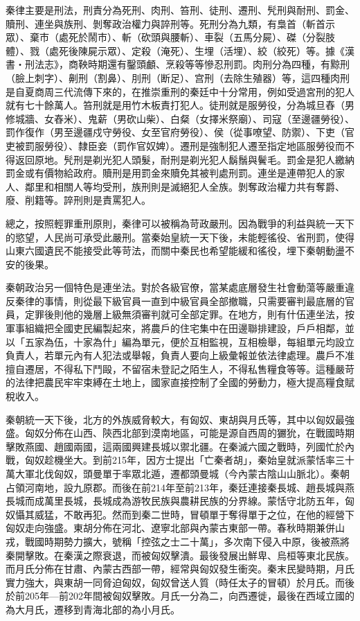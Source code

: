 秦律主要是刑法，刑責分為死刑、肉刑、笞刑、徒刑、遷刑、髠刑與耐刑、罰金、贖刑、連坐與族刑、剝奪政治權力與誶刑等。死刑分為九類，有梟首（斬首示眾）、棄市（處死於鬧市）、斬（砍頭與腰斬）、車裂（五馬分屍）、磔（分裂肢體）、戮（處死後陳屍示眾）、定殺（淹死）、生埋（活埋）、絞（絞死）等。據《漢書‧刑法志》，商鞅時期還有鑿頭顱、烹殺等等慘忍刑罰。肉刑分為四種，有黥刑（臉上刺字）、劓刑（割鼻）、刖刑（断足）、宫刑（去除生殖器）等，這四種肉刑是自夏商周三代流傳下來的，在推崇重刑的秦廷中十分常用，例如受過宮刑的犯人就有七十餘萬人。笞刑就是用竹木板責打犯人。徒刑就是服勞役，分為城旦舂（男修城牆、女舂米）、鬼薪（男砍山柴）、白粲（女擇米祭廟）、司寇（至邊疆勞役）、罰作復作（男至邊疆戍守勞役、女至官府勞役）、侯（從事嘹望、防禦）、下吏（官吏被罰服勞役）、隸臣妾（罰作官奴婢）。遷刑是強制犯人遷至指定地區服勞役而不得返回原地。髠刑是剃光犯人頭髮，耐刑是剃光犯人鬍鬚與鬢毛。罰金是犯人繳納罰金或有價物給政府。贖刑是用罰金來贖免其被判處刑罰。連坐是連帶犯人的家人、鄰里和相關人等均受刑，族刑則是滅絕犯人全族。剝奪政治權力共有奪爵、廢、削籍等。誶刑則是責罵犯人。

總之，按照輕罪重刑原則，秦律可以被稱為苛政嚴刑。因為戰爭的利益與統一天下的慾望，人民尚可承受此嚴刑。當秦始皇統一天下後，未能輕徭役、省刑罰，使得山東六國遺民不能接受此等苛法，而關中秦民也希望能緩和徭役，埋下秦朝動盪不安的後果。

秦朝政治另一個特色是連坐法。對於各級官僚，當某處底層發生社會動蕩等嚴重違反秦律的事情，則從最下級官員一直到中級官員全部撤職，只需要審判最底層的官員，定罪後則他的幾層上級無須審判就可全部定罪。在地方，則有什伍連坐法，按軍事組織把全國吏民編製起來，將農戶的住宅集中在田邊聯排建設，戶戶相鄰，並以「五家為伍，十家為什」編為單元，便於互相監視，互相檢舉，每組單元均設立負責人，若單元內有人犯法或舉報，負責人要向上級彙報並依法律處理。農戶不准擅自遷居，不得私下鬥毆，不留宿未登記之陌生人，不得私售糧食等等。這種嚴苛的法律把農民牢牢束縛在土地上，國家直接控制了全國的勞動力，極大提高糧食賦稅收入。

秦朝統一天下後，北方的外族威脅較大，有匈奴、東胡與月氏等，其中以匈奴最強盛。匈奴分佈在山西、陝西北部到漠南地區，可能是源自西周的玁狁，在戰國時期擊敗燕國、趙國兩國，這兩國興建長城以禦北疆。在秦滅六國之戰時，列國忙於內戰，匈奴趁機坐大。到前215年，因方士提出「亡秦者胡」，秦始皇就派蒙恬率三十萬大軍北伐匈奴，頭曼單于率眾北遁，遷都頭曼城（今內蒙古陰山山脈北）。秦朝占領河南地，設九原郡。而後在前214年至前213年，秦廷連接秦長城、趙長城與燕長城而成萬里長城，長城成為游牧民族與農耕民族的分界線。蒙恬守北防五年，匈奴懾其威猛，不敢再犯。然而到秦二世時，冒頓單于奪得單于之位，在他的經營下匈奴走向強盛。東胡分佈在河北、遼寧北部與內蒙古東部一帶。春秋時期兼併山戎，戰國時期勢力擴大，號稱「控弦之士二十萬」，多次南下侵入中原，後被燕將秦開擊敗。在秦漢之際衰退，而被匈奴擊潰。最後發展出鮮卑、烏桓等東北民族。而月氏分佈在甘肅、內蒙古西部一帶，經常與匈奴發生衝突。秦末民變時期，月氏實力強大，與東胡一同脅迫匈奴，匈奴曾送人質（時任太子的冒頓）於月氏。而後於前205年—前202年間被匈奴擊敗。月氏一分為二，向西遷徙，最後在西域立國的為大月氏，遷移到青海北部的為小月氏。

